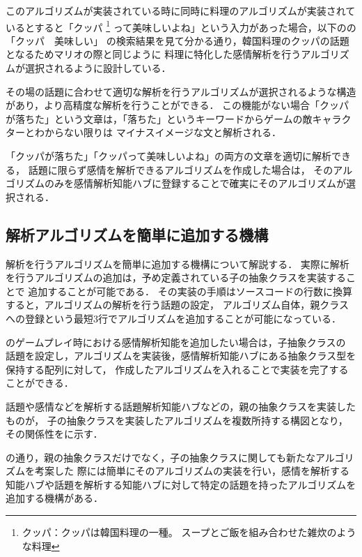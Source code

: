 このアルゴリズムが実装されている時に同時に料理のアルゴリズムが実装されているとすると「クッパ
\footnote{クッパ：クッパは韓国料理の一種。 スープとご飯を組み合わせた雑炊のような料理}
って美味しいよね」という入力があった場合，以下のの「クッパ　美味しい」
の検索結果を見て分かる通り，韓国料理のクッパの話題となるためマリオの際と同じように
料理に特化した感情解析を行うアルゴリズムが選択されるように設計している．


その場の話題に合わせて適切な解析を行うアルゴリズムが選択されるような構造があり，より高精度な解析を行うことができる．
この機能がない場合「クッパが落ちた」という文章は，「落ちた」というキーワードからゲームの敵キャラクターとわからない限りは
マイナスイメージな文と解析される．

「クッパが落ちた」「クッパって美味しいよね」の両方の文章を適切に解析できる，
話題に限らず感情を解析できるアルゴリズムを作成した場合は，
そのアルゴリズムのみを感情解析知能ハブに登録することで確実にそのアルゴリズムが選択される．
\newpage


\subsection{解析アルゴリズムを簡単に追加する機構}
解析を行うアルゴリズムを簡単に追加する機構について解説する．
実際に解析を行うアルゴリズムの追加は，予め定義されている子の抽象クラスを実装することで
追加することが可能である．
その実装の手順はソースコードの行数に換算すると，アルゴリズムの解析を行う話題の設定，
アルゴリズム自体，親クラスへの登録という最短3行でアルゴリズムを追加することが可能になっている．

のゲームプレイ時における感情解析知能を追加したい場合は，子抽象クラスの
話題を設定し，アルゴリズムを実装後，感情解析知能ハブにある抽象クラス型を保持する配列に対して，
作成したアルゴリズムを入れることで実装を完了することができる．

話題や感情などを解析する話題解析知能ハブなどの，親の抽象クラスを実装したものが，
子の抽象クラスを実装したアルゴリズムを複数所持する構図となり，その関係性をに示す．


の通り，親の抽象クラスだけでなく，子の抽象クラスに関しても新たなアルゴリズムを考案した
際には簡単にそのアルゴリズムの実装を行い，感情を解析する
知能ハブや話題を解析する知能ハブに対して特定の話題を持ったアルゴリズムを追加する機構がある．

